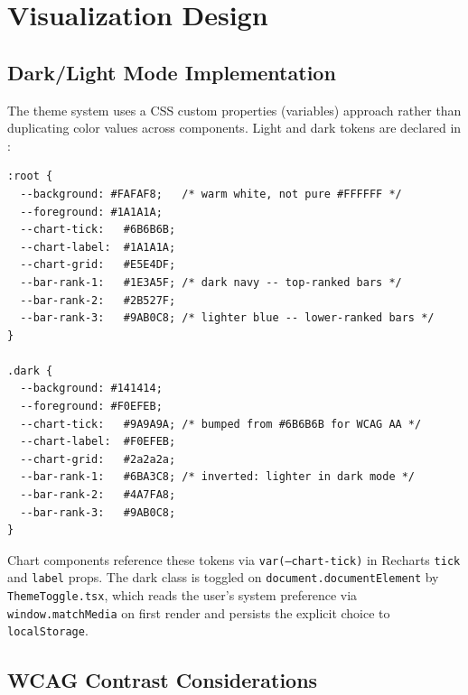 \section{Visualization Design}
\label{sec:airbnb-viz}


\subsection{Dark/Light Mode Implementation}

The theme system uses a CSS custom properties (variables) approach rather than
duplicating color values across components. Light and dark tokens are declared in
:

\begin{lstlisting}[language={},caption={CSS token system in \filepath{src/app/globals.css} (lines 5--47)}]
:root {
  --background: #FAFAF8;   /* warm white, not pure #FFFFFF */
  --foreground: #1A1A1A;
  --chart-tick:   #6B6B6B;
  --chart-label:  #1A1A1A;
  --chart-grid:   #E5E4DF;
  --bar-rank-1:   #1E3A5F; /* dark navy -- top-ranked bars */
  --bar-rank-2:   #2B527F;
  --bar-rank-3:   #9AB0C8; /* lighter blue -- lower-ranked bars */
}

.dark {
  --background: #141414;
  --foreground: #F0EFEB;
  --chart-tick:   #9A9A9A; /* bumped from #6B6B6B for WCAG AA */
  --chart-label:  #F0EFEB;
  --chart-grid:   #2a2a2a;
  --bar-rank-1:   #6BA3C8; /* inverted: lighter in dark mode */
  --bar-rank-2:   #4A7FA8;
  --bar-rank-3:   #9AB0C8;
}
\end{lstlisting}

Chart components reference these tokens via \texttt{var(--chart-tick)} in Recharts
\texttt{tick} and \texttt{label} props. The dark class is toggled on
\texttt{document.documentElement} by \texttt{ThemeToggle.tsx}, which reads the
user's system preference via \texttt{window.matchMedia} on first render and
persists the explicit choice to \texttt{localStorage}.

\subsection{WCAG Contrast Considerations}

